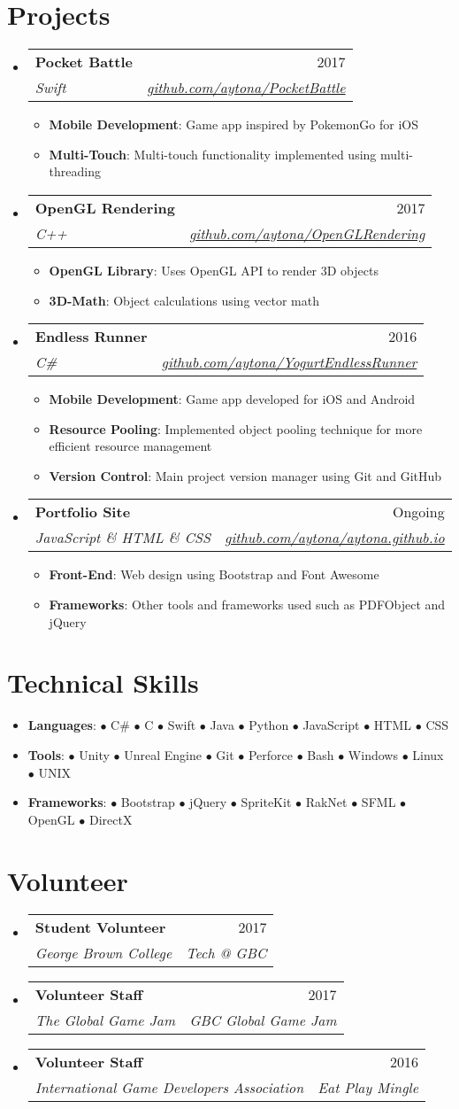 \documentclass[a4paper,11pt]{article}
\makeatletter
\newcommand{\resumeItem}[2]{
  \item\small{
    \textbf{#1}{: #2 \vspace{-2pt}}
  }
}
\newcommand{\resumeSubheading}[4]{
  \vspace{-1pt}\item
    \begin{tabular*}{0.975\textwidth}{l@{\extracolsep{\fill}}r}
      \textbf{#1} & #2 \\
      \textit{\small#3} & \textit{\small #4} \\
    \end{tabular*}\vspace{-5pt}
}
\newcommand{\resumeSubItem}[2]{\resumeItem{#1}{#2}\vspace{-4pt}}
\newcommand{\resumeSubHeadingListStart}{\begin{itemize}[leftmargin=*,label={}]}
\newcommand{\resumeSubHeadingListEnd}{\end{itemize}}
\newcommand{\resumeItemListStart}{\begin{itemize}}
\newcommand{\resumeItemListEnd}{\end{itemize}\vspace{-5pt}}
\makeatother
\begin{document}
\section{Projects}
\resumeSubHeadingListStart
	\resumeSubheading{Pocket Battle}{2017}{Swift}{\href{https://github.com/aytona/PocketBattle}{github.com/aytona/PocketBattle}}
	\resumeItemListStart
		\resumeItem{Mobile Development}{Game app inspired by PokemonGo for iOS}
		\resumeItem{Multi-Touch}{Multi-touch functionality implemented using multi-threading}
	\resumeItemListEnd
	\resumeSubheading{OpenGL Rendering}{2017}{C++}{\href{https://github.com/aytona/OpenGLRendering}{github.com/aytona/OpenGLRendering}}
	\resumeItemListStart
		\resumeItem{OpenGL Library}{Uses OpenGL API to render 3D objects}
		\resumeItem{3D-Math}{Object calculations using vector math}
	\resumeItemListEnd
	\resumeSubheading{Endless Runner}{2016}{C\#}{\href{https://github.com/aytona/YogurtEndlessRunner}{github.com/aytona/YogurtEndlessRunner}}
	\resumeItemListStart
		\resumeItem{Mobile Development}{Game app developed for iOS and Android}
		\resumeItem{Resource Pooling}{Implemented object pooling technique for more efficient resource management}
		\resumeItem{Version Control}{Main project version manager using Git and GitHub}
	\resumeItemListEnd
	\resumeSubheading{Portfolio Site}{Ongoing}{JavaScript \& HTML \& CSS}{\href{https://github.com/aytona/aytona.github.io}{github.com/aytona/aytona.github.io}}
	\resumeItemListStart
		\resumeItem{Front-End}{Web design using Bootstrap and Font Awesome}
		\resumeItem{Frameworks}{Other tools and frameworks used such as PDFObject and jQuery}
	\resumeItemListEnd
\resumeSubHeadingListEnd
\section{Technical Skills}
\resumeSubHeadingListStart
\resumeSubItem{Languages}{$\bullet$ C\# $\bullet$ C $\bullet$ Swift $\bullet$ Java $\bullet$ Python $\bullet$ JavaScript $\bullet$ HTML $\bullet$ CSS}
\resumeSubItem{Tools}{$\bullet$ Unity $\bullet$ Unreal Engine $\bullet$ Git $\bullet$ Perforce $\bullet$ Bash $\bullet$ Windows $\bullet$ Linux $\bullet$ UNIX}
\resumeSubItem{Frameworks}{$\bullet$ Bootstrap $\bullet$ jQuery $\bullet$ SpriteKit $\bullet$ RakNet $\bullet$ SFML $\bullet$ OpenGL $\bullet$ DirectX}
\resumeSubHeadingListEnd
\section{Volunteer}
\resumeSubHeadingListStart
\resumeSubheading{Student Volunteer}{2017}{George Brown College}{Tech @ GBC}
\resumeSubheading{Volunteer Staff}{2017}{The Global Game Jam}{GBC Global Game Jam}
\resumeSubheading{Volunteer Staff}{2016}{International Game Developers Association}{Eat Play Mingle}
\resumeSubHeadingListEnd
\end{document}
